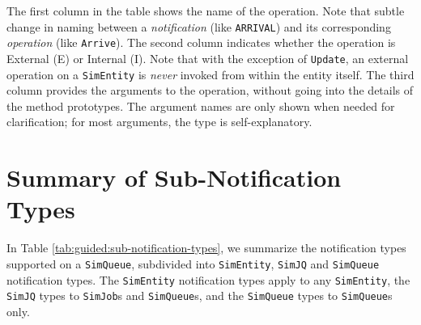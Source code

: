 The first column in the table shows the name of the operation.
Note that subtle change in naming between
  a {\em notification\/} (like \lstinline|ARRIVAL|)
  and its corresponding {\em operation\/} (like \lstinline|Arrive|).
The second column indicates whether the operation
  is External (E) or Internal (I).
Note that with the exception of \lstinline|Update|,
  an external operation on a \lstinline|SimEntity|
  is {\em never\/} invoked from within the entity itself.
The third column provides the arguments to the operation,
  without going into the details of the method prototypes.
The argument names are only shown when needed for clarification;
  for most arguments, the type is self-explanatory.

\section{Summary of Sub-Notification Types}

In Table \ref{tab:guided:sub-notification-types},
  we summarize the notification types supported on a \lstinline|SimQueue|,
  subdivided into \lstinline|SimEntity|, \lstinline|SimJQ|
  and \lstinline|SimQueue| notification types.
The \lstinline|SimEntity| notification types
  apply to any \lstinline|SimEntity|,
  the \lstinline|SimJQ| types to \lstinline|SimJob|s and \lstinline|SimQueue|s,
  and the \lstinline|SimQueue| types to \lstinline|SimQueue|s only.

